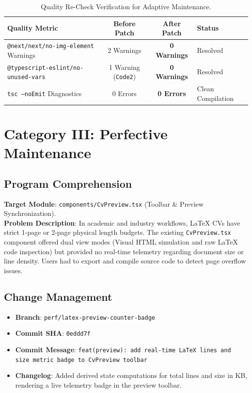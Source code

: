 \documentclass[12pt,a4paper]{article}
\begin{document}
\begin{table}[H]
\centering
\small
\begin{tabularx}{\textwidth}{l c c X}
\toprule
\textbf{Quality Metric} & \textbf{Before Patch} & \textbf{After Patch} & \textbf{Status} \\
\midrule
\texttt{@next/next/no-img-element} Warnings & 2 Warnings & \textbf{0 Warnings} & Resolved \\
\texttt{@typescript-eslint/no-unused-vars} & 1 Warning (\texttt{Code2}) & \textbf{0 Warnings} & Resolved \\
\texttt{tsc --noEmit} Diagnostics & 0 Errors & \textbf{0 Errors} & Clean Compilation \\
\bottomrule
\end{tabularx}
\caption{Quality Re-Check Verification for Adaptive Maintenance.}
\label{tab:adapt_qa}
\end{table}

\newpage

\section{Category III: Perfective Maintenance}

\subsection{Program Comprehension}
\textbf{Target Module}: \texttt{components/CvPreview.tsx} (Toolbar \& Preview Synchronization).\\
\textbf{Problem Description}: In academic and industry workflows, LaTeX CVs have strict 1-page or 2-page physical length budgets. The existing \texttt{CvPreview.tsx} component offered dual view modes (Visual HTML simulation and raw LaTeX code inspection) but provided no real-time telemetry regarding document size or line density. Users had to export and compile source code to detect page overflow issues.

\subsection{Change Management}
\begin{itemize}[noitemsep]
    \item \textbf{Branch}: \texttt{perf/latex-preview-counter-badge}
    \item \textbf{Commit SHA}: \texttt{0eddd7f}
    \item \textbf{Commit Message}: \texttt{feat(preview): add real-time LaTeX lines and size metric badge to CvPreview toolbar}
    \item \textbf{Changelog}: Added derived state computations for total lines and size in KB, rendering a live telemetry badge in the preview toolbar.
\end{itemize}
\end{document}
